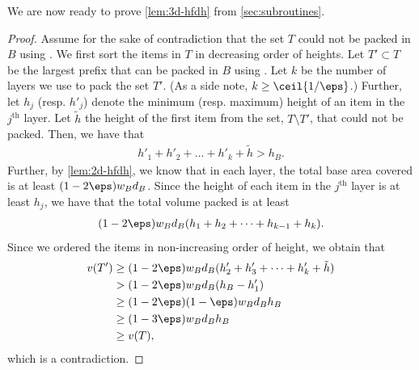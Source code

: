 We are now ready to prove \cref{lem:3d-hfdh} from \cref{sec:subroutines}.
\threednfdh*
\begin{proof}
    Assume for the sake of contradiction that the set $T$ could not be packed in $B$ using \tNFDH. We first sort the items in $T$ in decreasing order of heights.
    Let $T'\subset T$ be the largest prefix that can be packed in $B$ using \tNFDH.
    Let $k$ be the number of layers we use to pack the set $T'$.
    (As a side note, $k\ge \ceil{1/\eps}$.)
    Further, let $h_j$ (resp. $h'_j$) denote the minimum (resp. maximum) height of an item in the $j^{\textrm{th}}$ layer.
    Let $\tilde h$ the height of the first item from the set, $T\setminus T'$, that could not be packed.
    Then, we have that
    \begin{align*}
        h'_1+h'_2+\dots+h'_k+\tilde{h}>h_B.
    \end{align*}
    Further, by \cref{lem:2d-hfdh}, we know that in each layer, the total base area covered is at least $(1-2\eps)w_Bd_B$.
    Since the height of each item in the $j^{\text{th}}$ layer is at least $h_j$, we have that the total volume packed is at least
    \begin{align*}
        (1-2\eps)w_Bd_B(h_1+h_2+\dots+h_{k-1}+h_k).
    \end{align*}
    Since we ordered the items in non-increasing order of height, we obtain that
    \begin{align*}
        v(T')&\ge(1-2\eps)w_Bd_B(h'_2+h'_3+\dots+h'_k+\tilde{h})\\
        &>(1-2\eps)w_Bd_B(h_B-h'_1)\\
        &\ge (1-2\eps)(1-\eps)w_Bd_Bh_B\\
        &\ge (1-3\eps)w_Bd_Bh_B\\
        &\ge v(T),
    \end{align*}
    which is a contradiction. 
\end{proof}

